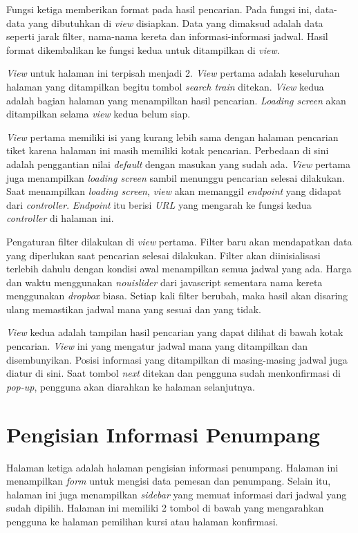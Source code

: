 Fungsi ketiga memberikan format pada hasil pencarian. Pada fungsi ini, data-data yang dibutuhkan di \textit{view} disiapkan. Data yang dimaksud adalah data seperti jarak filter, nama-nama kereta dan informasi-informasi jadwal. Hasil format dikembalikan ke fungsi kedua untuk ditampilkan di \textit{view}.

\textit{View} untuk halaman ini terpisah menjadi 2. \textit{View} pertama adalah keseluruhan halaman yang ditampilkan begitu tombol \textit{search train} ditekan. \textit{View} kedua adalah bagian halaman yang menampilkan hasil pencarian. \textit{Loading screen} akan ditampilkan selama \textit{view} kedua belum siap.

\textit{View} pertama memiliki isi yang kurang lebih sama dengan halaman pencarian tiket karena halaman ini masih memiliki kotak pencarian. Perbedaan di sini adalah penggantian nilai \textit{default} dengan masukan yang sudah ada. \textit{View} pertama juga menampilkan \textit{loading screen} sambil menunggu pencarian selesai dilakukan. Saat menampilkan \textit{loading screen}, \textit{view} akan memanggil \textit{endpoint} yang didapat dari \textit{controller}. \textit{Endpoint} itu berisi \textit{URL} yang mengarah ke fungsi kedua \textit{controller} di halaman ini. 

Pengaturan filter dilakukan di \textit{view} pertama. Filter baru akan mendapatkan data yang diperlukan saat pencarian selesai dilakukan. Filter akan diinisialisasi terlebih dahulu dengan kondisi awal menampilkan semua jadwal yang ada. Harga dan waktu menggunakan \textit{nouislider} dari javascript sementara nama kereta menggunakan \textit{dropbox} biasa. Setiap kali filter berubah, maka hasil akan disaring ulang memastikan jadwal mana yang sesuai dan yang tidak.

\textit{View} kedua adalah tampilan hasil pencarian yang dapat dilihat di bawah kotak pencarian. \textit{View} ini yang mengatur jadwal mana yang ditampilkan dan disembunyikan. Posisi informasi yang ditampilkan di masing-masing jadwal juga diatur di sini. Saat tombol \textit{next} ditekan dan pengguna sudah menkonfirmasi di \textit{pop-up}, pengguna akan diarahkan ke halaman selanjutnya.

\section{Pengisian Informasi Penumpang}
\label{sec:pengisianinfopenumpang}

Halaman ketiga adalah halaman pengisian informasi penumpang. Halaman ini menampilkan \textit{form} untuk mengisi data pemesan dan penumpang. Selain itu, halaman ini juga menampilkan \textit{sidebar} yang memuat informasi dari jadwal yang sudah dipilih. Halaman ini memiliki 2 tombol di bawah yang mengarahkan pengguna ke halaman pemilihan kursi atau halaman konfirmasi.

